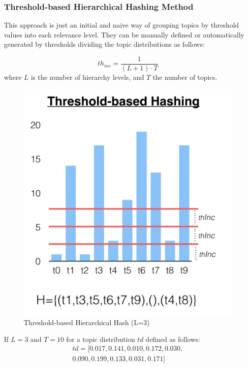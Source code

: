 \subsubsection{Threshold-based Hierarchical Hashing Method}
\label{sec:comparison-threshold}
This approach is just an initial and naive way of grouping topics by threshold values into each relevance level. They can be manually defined or automatically generated by thresholds dividing the topic distributions as follows:

\begin{equation}
th_{inc} = \frac{1}{(L+1) \cdot T}
\label{eq:th}
\end{equation}
where $L$ is the number of hierarchy levels, and $T$ the number of topics.

\begin{figure}[t]\centering
\includegraphics[scale=0.35]{threshold-hash.png}
\caption{Threshold-based Hierarchical Hash (L=3)}
\label{fig:th_hash}
\end{figure}

If $L=3$ and $T=10$ for a topic distribution $td$ defined as follows:
\begin{equation}
    \begin{gathered}
td=[0.017, 0.141, 0.010, 0.172, 0.030, \\
0.090, 0.199,  0.133,  0.031, 0.171]
    \end{gathered}
    \label{eq:sample}
\end{equation}

